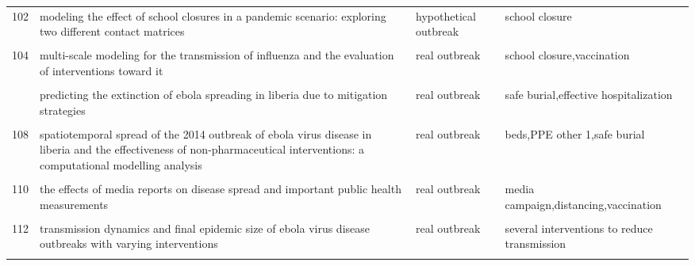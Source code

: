 \documentclass[
]{article}
\begin{document}
\begin{landscape}
\begin{longtable}{l>{\raggedright\arraybackslash}p{3cm}l>{\raggedright\arraybackslash}p{8cm}}
102 & modeling the effect of school closures in a pandemic scenario: exploring two different contact matrices & hypothetical outbreak & school closure\\
\cellcolor{gray!6}{103} & \cellcolor{gray!6}{modelling the effect of early detection of ebola} & \cellcolor{gray!6}{hypothetical outbreak} & \cellcolor{gray!6}{isolation}\\
104 & multi-scale modeling for the transmission of influenza and the evaluation of interventions toward it & real outbreak & school closure,vaccination\\
\cellcolor{gray!6}{105} & \cellcolor{gray!6}{optimal intervention strategies for a seir control model of ebola epidemics} & \cellcolor{gray!6}{real outbreak} & \cellcolor{gray!6}{reducing transmission}\\
\addlinespace
106 & predicting the extinction of ebola spreading in liberia due to mitigation strategies & real outbreak & safe burial,effective hospitalization\\
\cellcolor{gray!6}{107} & \cellcolor{gray!6}{school closure strategies for the 2009 hong kong hini influenza pandemic} & \cellcolor{gray!6}{hypothetical outbreak} & \cellcolor{gray!6}{school closure}\\
108 & spatiotemporal spread of the 2014 outbreak of ebola virus disease in liberia and the effectiveness of non-pharmaceutical interventions: a computational modelling analysis & real outbreak & beds,PPE other 1,safe burial\\
\cellcolor{gray!6}{109} & \cellcolor{gray!6}{strategies for early vaccination during novel influenza outbreaks} & \cellcolor{gray!6}{hypothetical outbreak} & \cellcolor{gray!6}{vaccination}\\
110 & the effects of media reports on disease spread and important public health measurements & real outbreak & media campaign,distancing,vaccination\\
\addlinespace
\cellcolor{gray!6}{111} & \cellcolor{gray!6}{the impact of human behavioral changes in 2014 west africa ebola outbreak} & \cellcolor{gray!6}{real outbreak} & \cellcolor{gray!6}{behavioural change}\\
112 & transmission dynamics and final epidemic size of ebola virus disease outbreaks with varying interventions & real outbreak & several interventions to reduce transmission\\
\cellcolor{gray!6}{113} & \cellcolor{gray!6}{treatment–donation-stockpile dynamics in ebola convalescent blood transfusion therapy} & \cellcolor{gray!6}{real outbreak} & \cellcolor{gray!6}{treatment}\\

\end{longtable}
\end{landscape}
\end{document}
